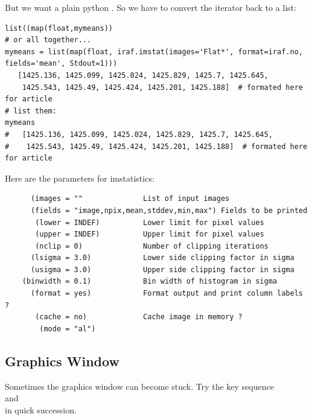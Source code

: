 But we want a plain python . So we have to convert the iterator back to
a list:
\begingroup \fontsize{10pt}{10pt}
\selectfont
\begin{verbatim} 
list((map(float,mymeans))
# or all together...
mymeans = list(map(float, iraf.imstat(images='Flat*', format=iraf.no, fields='mean', Stdout=1)))
   [1425.136, 1425.099, 1425.024, 1425.829, 1425.7, 1425.645, 
    1425.543, 1425.49, 1425.424, 1425.201, 1425.188]  # formated here for article
# list them:
mymeans
#   [1425.136, 1425.099, 1425.024, 1425.829, 1425.7, 1425.645, 
#    1425.543, 1425.49, 1425.424, 1425.201, 1425.188]  # formated here for article
\end{verbatim}
\endgroup

Here are the parameters for imstatistics:
\begingroup \fontsize{10pt}{10pt}
\selectfont
\begin{verbatim} 
      (images = ""              List of input images
      (fields = "image,npix,mean,stddev,min,max") Fields to be printed
       (lower = INDEF)          Lower limit for pixel values
       (upper = INDEF)          Upper limit for pixel values
       (nclip = 0)              Number of clipping iterations
      (lsigma = 3.0)            Lower side clipping factor in sigma
      (usigma = 3.0)            Upper side clipping factor in sigma
    (binwidth = 0.1)            Bin width of histogram in sigma
      (format = yes)            Format output and print column labels ?
       (cache = no)             Cache image in memory ?
        (mode = "al")  
\end{verbatim}
\endgroup

\subsection{Graphics Window}

Sometimes the graphics window can become stuck. Try the key sequence \\
 and \\
in quick succession.

